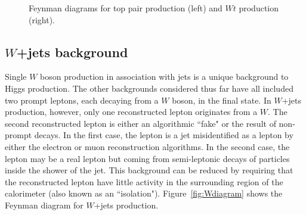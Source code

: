 \begin{figure}[h!]
  \centering
  \captionsetup{justification=centering}

  \hspace{20pt}
  \caption{Feynman diagrams for top pair production (left) and $Wt$ production (right).}
  \label{fig:Topdiagram}
\end{figure}

\subsection{$W$+jets background}

Single $W$ boson production in association with jets is a unique background to Higgs production. The other backgrounds considered thus far have all included two prompt leptons, each decaying from a $W$ boson, in the final state. In $W$+jets production, however, only one reconstructed lepton originates from a $W$. The second reconstructed lepton is either an algorithmic ``fake" or the result of non-prompt decays. In the first case, the lepton is a jet misidentified as a lepton by either the electron or muon reconstruction algorithms. In the second case, the lepton may be a real lepton but coming from semi-leptonic decays of particles inside the shower of the jet. This background can be reduced by requiring that the reconstructed lepton have little activity in the surrounding region of the calorimeter (also known as an ``isolation"). Figure~\ref{fig:Wdiagram} shows the Feynman diagram for $W$+jets production. 

